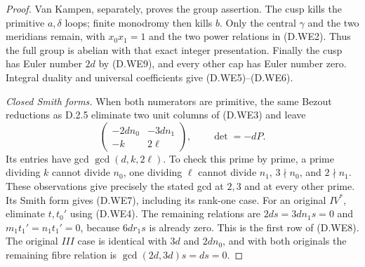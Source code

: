\begin{proof}
Van Kampen, separately, proves the group assertion.
The cusp kills the primitive $a,\delta$ loops;
finite monodromy then kills $b$. Only the central
$\gamma$ and the two meridians remain, with
$x_0x_1=1$ and the two power relations in (D.WE2).
Thus the full group is abelian with that exact
integer presentation. Finally the cusp has Euler
number $2d$ by (D.WE9), and every other cap has
Euler number zero. Integral duality and universal
coefficients give (D.WE5)--(D.WE6).

\emph{Closed Smith forms.}
When both numerators are primitive, the same
Bezout reductions as D.2.5 eliminate two unit
columns of (D.WE3) and leave
\[
 \begin{pmatrix}
 -2dn_0&-3dn_1\\-k&2\ell
 \end{pmatrix},\qquad \det=-dP .
\]
Its entries have gcd $\gcd(d,k,2\ell)$.
To check this prime by prime, a prime dividing
$k$ cannot divide $n_0$, one dividing $\ell$
cannot divide $n_1$, $3\nmid n_0$, and $2\nmid n_1$.
These observations give precisely the stated gcd
at $2,3$ and at every other prime. Its Smith
form gives (D.WE7), including its rank-one case.
For an original $IV^*$, eliminate $t,t_0'$ using
(D.WE4). The remaining relations are
$2ds=3dn_1s=0$ and
$m_1t_1'=n_1t_1'=0$, because $6dr_1s$ is already
zero. This is the first row of (D.WE8).
The original $III$ case is identical with
$3d$ and $2dn_0$, and with both originals the
remaining fibre relation is $\gcd(2d,3d)s=ds=0$.
\end{proof}
